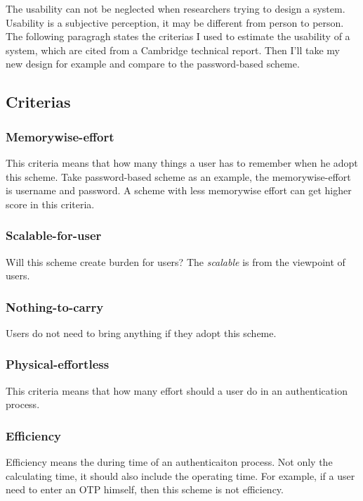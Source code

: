 \begin{CJK}{Bg5}{bsmi}
The usability can not be neglected when researchers trying to design a system.
Usability is a subjective perception, it may be different from person to person.
The following paragragh states the criterias I used to estimate the usability of a system, which are cited from a Cambridge technical report\cite{password-extended}. Then I'll take my new design for example and compare to the password-based scheme.

\subsection{Criterias}

\subsubsection{Memorywise-effort}

This criteria means that how many things a user has to remember when he adopt this scheme. Take password-based scheme as an example, the memorywise-effort is username and password. A scheme with less memorywise effort can get higher score in this criteria.

\subsubsection{Scalable-for-user}

Will this scheme create burden for users? The \emph{scalable} is from the viewpoint of users.

\subsubsection{Nothing-to-carry}

Users do not need to bring anything if they adopt this scheme.

\subsubsection{Physical-effortless}

This criteria means that how many effort should a user do in an authentication process.

\subsubsection{Efficiency}

Efficiency means the during time of an authenticaiton process. Not only the calculating time, it should also include the operating time. For example, if a user need to enter an OTP himself, then this scheme is not efficiency.


\end{CJK}
